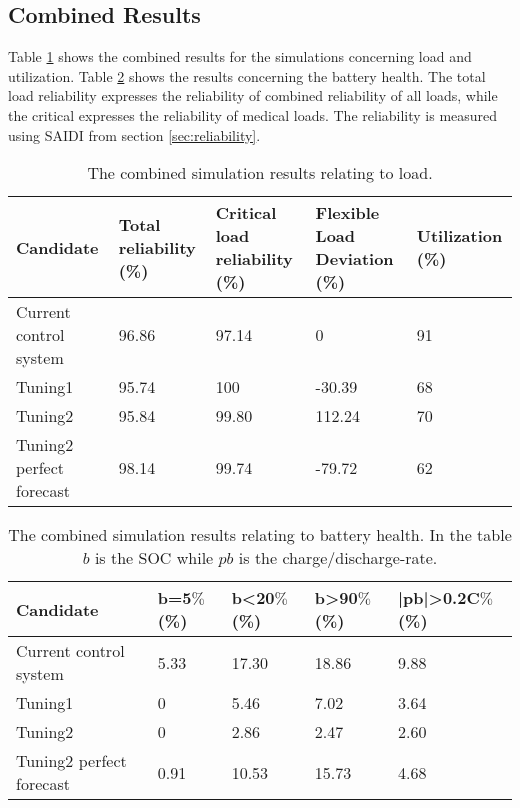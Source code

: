 \subsection{Combined Results}
Table \ref{tab:combined_results_load} shows the combined results for the simulations concerning load and utilization. Table \ref{tab:combined_results_battery} shows the results concerning the battery health. The total load reliability expresses the reliability of combined reliability of all loads, while the critical expresses the reliability of medical loads. The reliability is measured using SAIDI from section \ref{sec:reliability}. 


\begin{table}[h]
    \centering
    \fontsize{12pt}{12pt}\selectfont
    \begin{tabular}{p{3cm}||p{2cm}|p{2.5cm}|p{2.5cm}|p{1cm}}
       Candidate  & Total reliability (\%) & Critical load reliability (\%) & Flexible Load Deviation (\%) & Utilization (\%)\\
       \hline
       \hline
       Current control system       & 96.86 & 97.14 & 0 & 91\\
       \hline
       Tuning1                      & 95.74 & 100 & -30.39 & 68\\
       \hline
       Tuning2                      & 95.84 & 99.80 & 112.24 & 70\\
       \hline
       Tuning2 perfect forecast     & 98.14 & 99.74 & -79.72 & 62\\
       
    \end{tabular}
    \caption[Simulation results - Load]{The combined simulation results relating to load.}
    \label{tab:combined_results_load}
\end{table}

\begin{table}[h]
    \centering
    \begin{tabular}{p{3cm}||p{2cm}|p{2cm}|p{2cm}|p{2cm}}
       Candidate  & b=5$\%$ (\%) &b<20$\%$ (\%) & b>90$\%$ (\%) & |pb|>0.2C$\%$ (\%)\\
       \hline
       \hline
        Current control system  & 5.33 & 17.30 & 18.86 & 9.88\\
       \hline
       Tuning1                  & 0 & 5.46 & 7.02 & 3.64\\
       \hline
       Tuning2                  & 0 & 2.86 & 2.47 & 2.60\\
       \hline
       Tuning2 perfect forecast & 0.91 & 10.53 & 15.73 & 4.68\\
       
    \end{tabular}
    \caption[Simulation results - Battery]{The combined simulation results relating to battery health. In the table $b$ is the SOC while $pb$ is the charge/discharge-rate.}
    \label{tab:combined_results_battery}
\end{table}

